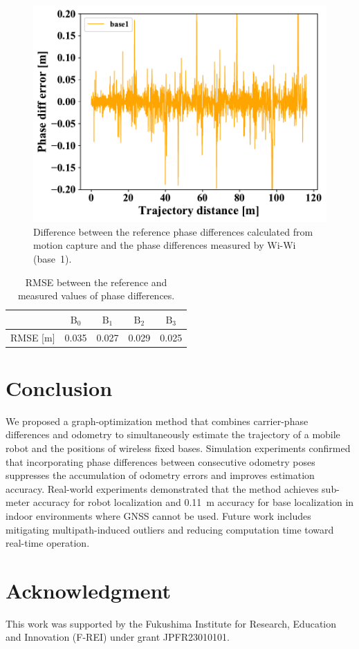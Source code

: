 \documentclass[conference]{IEEEtran}
\begin{document}
\begin{figure}
    \centering
    \includegraphics[width=0.99\linewidth]{figures/robosym_distance_pdm_differences.pdf}
    \caption{Difference between the reference phase differences calculated from motion capture and the phase differences measured by Wi-Wi (base~1).}
    \label{fig:vicon_vs_wiwi}
\end{figure}

\begin{table}[tb]
    \centering
    \caption{RMSE between the reference and measured values of phase differences.}
    \begin{tabular}{|c|c|c|c|c|}
    \hline
         & $\mathrm{B}_0$ & $\mathrm{B}_1$ & $\mathrm{B}_2$ & $\mathrm{B}_3$ \\
    \hline
     RMSE [m] & 0.035 & 0.027 & 0.029 & 0.025 \\
     \hline
    \end{tabular}
    \label{tab:vicon_vs_wiwi}
\end{table}

\section{Conclusion}
We proposed a graph-optimization method that combines carrier-phase differences and odometry to simultaneously estimate the trajectory of a mobile robot and the positions of wireless fixed bases.
Simulation experiments confirmed that incorporating phase differences between consecutive odometry poses suppresses the accumulation of odometry errors and improves estimation accuracy.
Real-world experiments demonstrated that the method achieves sub-meter accuracy for robot localization and 0.11~m accuracy for base localization in indoor environments where GNSS cannot be used.
Future work includes mitigating multipath-induced outliers and reducing computation time toward real-time operation.

\section*{Acknowledgment}
This work was supported by the Fukushima Institute for Research, Education and Innovation (F-REI) under grant JPFR23010101.



\end{document}
